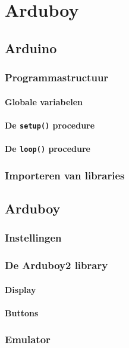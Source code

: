 \documentclass[11pt,fleqn]{book} %
\begin{document}
\part{Arduboy}

\chapter{Arduino}
\section{Programmastructuur}
\subsection{Globale variabelen}
\subsection{De \texttt{setup()} procedure}
\subsection{De \texttt{loop()} procedure}

\section{Importeren van libraries}

\chapter{Arduboy}
\section{Instellingen}

\section{De Arduboy2 library}
\subsection{Display}
\subsection{Buttons}

\section{Emulator}
\end{document}
